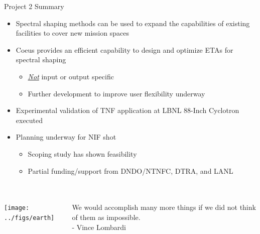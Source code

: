 \documentclass[xcolor=x11names,compress,handout]{beamer}
\renewcommand{\(}{\begin{columns}}
\renewcommand{\)}{\end{columns}}
\newcommand{\<}[1]{\begin{column}{#1}}
\renewcommand{\>}{\end{column}}
\begin{document}
\begin{frame}{Project 2 Summary}
  \begin{itemize}
    \item Spectral shaping methods can be used to expand the capabilities of existing facilities to cover new mission spaces \newline
    \item Coeus provides an efficient capability to design and optimize ETAs for spectral shaping 
    \begin{itemize}
      \item \textit{\underline{Not}} input or output specific
      \item Further development to improve user flexibility underway \newline
    \end{itemize}
    \item Experimental validation of TNF application at LBNL 88-Inch Cyclotron executed \newline
    \item Planning underway for NIF shot
    \begin{itemize}
      \item Scoping study has shown feasibility
      \item Partial funding/support from DNDO/NTNFC, DTRA, and LANL \newline
    \end{itemize}
      
  \end{itemize}
\end{frame}

\section*{}
\begin{frame}[fragile]
        \begin{columns}
        \begin{column}{0.55\linewidth}
          \texttt{[image: ../figs/earth]}
        \end{column}
        
        \begin{column}{0.45\linewidth}
We would accomplish many more things if we did not think of them as impossible. \\
\vspace*{1em}
- Vince Lombardi
        \end{column}
      \end{columns}
  \begin{center}
  \end{center}
  
\end{frame}
\end{document}
